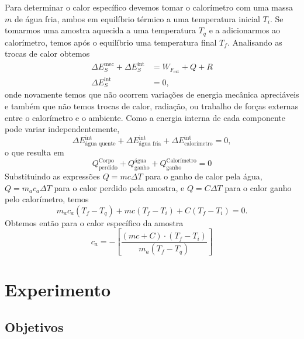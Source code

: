 Para determinar o calor específico devemos tomar o calorímetro com uma massa $m$ de água fria, ambos em equilíbrio térmico a uma temperatura inicial $T_i$. Se tomarmos uma amostra aquecida a uma temperatura $T_q$ e a adicionarmos ao calorímetro, temos após o equilíbrio uma temperatura final $T_f$. Analisando as trocas de calor obtemos
\begin{align}
    \Delta E_S^{\text{mec}} + \Delta E_S^{\text{int}} &= W_{F_{\text{ext}}} + Q + R \\
    \Delta E_S^{\text{int}} &= 0,
\end{align}
%
onde novamente temos que não ocorrem variações de energia mecânica apreciáveis e também que não temos trocas de calor, radiação, ou trabalho de forças externas entre o calorímetro e o ambiente. Como a energia interna de cada componente pode variar independentemente,
\begin{equation}
    \Delta E_{\text{água quente}}^{\text{int}} + \Delta E_{\text{água fria}}^{\text{int}} + \Delta E_{\text{calorímetro}}^{\text{int}} = 0,
\end{equation}
%
o que resulta em
\begin{equation}
	Q^{\text{Corpo}}_{\text{perdido}} + Q^{\text{água}}_{\text{ganho}} + Q^{\text{Calorímetro}}_{\text{ganho}} = 0
\end{equation}
%
Substituindo as expressões $Q = m c \Delta T$ para o ganho de calor pela água, $Q = m_a c_a \Delta T$ para o calor perdido pela amostra, e $Q = C\Delta T$ para o calor ganho pelo calorímetro, temos
\begin{equation}
	m_a c_a (T_f - T_q) + m c (T_f - T_i) + C (T_f-T_i) = 0.
\end{equation}
%
Obtemos então para o calor específico da amostra
\begin{equation}
	c_a = - \left[\frac{(mc + C)\cdot(T_f - T_i)}{m_a (T_f - T_q)}\right]
\end{equation}

\section{Experimento}

\subsection{Objetivos}
\label{Sec:ObjetivosCalorEspecifico}

